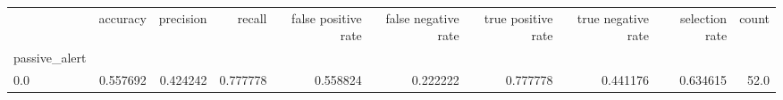 \begin{tabular}{lrrrrrrrrr}
\toprule
{} &  accuracy &  precision &    recall &  false positive rate &  false negative rate &  true positive rate &  true negative rate &  selection rate &  count \\
passive\_alert &           &            &           &                      &                      &                     &                     &                 &        \\
\midrule
0.0           &  0.557692 &   0.424242 &  0.777778 &             0.558824 &             0.222222 &            0.777778 &            0.441176 &        0.634615 &   52.0 \\
\bottomrule
\end{tabular}
